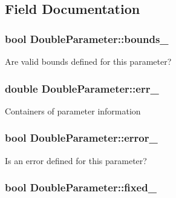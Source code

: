 \subsection{Field Documentation}
\hypertarget{class_double_parameter_a08c6fd32e356cec94d0cc57a95cd9d9e}{
\subsubsection[{bounds\-\_\-}]{\setlength{\rightskip}{0pt plus 5cm}bool Double\-Parameter\-::bounds\-\_\-\hspace{0.3cm}{\ttfamily [protected]}}}\label{class_double_parameter_a08c6fd32e356cec94d0cc57a95cd9d9e}
Are valid bounds defined for this parameter? \hypertarget{class_double_parameter_a02ff8b300a991588e85d010940767d03}{
\subsubsection[{err\-\_\-}]{\setlength{\rightskip}{0pt plus 5cm}double Double\-Parameter\-::err\-\_\-\hspace{0.3cm}{\ttfamily [protected]}}}\label{class_double_parameter_a02ff8b300a991588e85d010940767d03}
Containers of parameter information \hypertarget{class_double_parameter_a6b1d5b9ac1f8f3bb992a69f1c3e06edd}{
\subsubsection[{error\-\_\-}]{\setlength{\rightskip}{0pt plus 5cm}bool Double\-Parameter\-::error\-\_\-\hspace{0.3cm}{\ttfamily [protected]}}}\label{class_double_parameter_a6b1d5b9ac1f8f3bb992a69f1c3e06edd}
Is an error defined for this parameter? \hypertarget{class_double_parameter_a579abb4fe62c4e9c7d3224241b4c9b67}{
\subsubsection[{fixed\-\_\-}]{\setlength{\rightskip}{0pt plus 5cm}bool Double\-Parameter\-::fixed\-\_\-\hspace{0.3cm}{\ttfamily [protected]}}}\label{class_double_parameter_a579abb4fe62c4e9c7d3224241b4c9b67}
